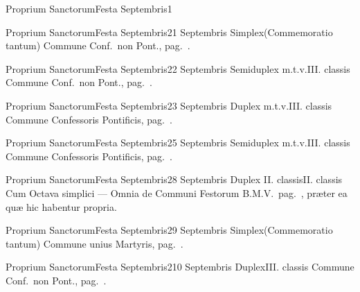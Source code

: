 \documentclass[nocturnale-romanum.tex]{subfiles}
\begin{document}
	{Proprium Sanctorum}{Festa Septembris}{1}{}
	{}{}{}{}

	{Proprium Sanctorum}{Festa Septembris}{2}{1 Septembris}
	{Simplex}{(Commemoratio tantum)}
	{Commune Conf.\ non Pont., pag.\ \pageref{M-CONP}.}
	{}

	{Proprium Sanctorum}{Festa Septembris}{2}{2 Septembris}
	{Semiduplex m.t.v.}{III. classis}
	{Commune Conf.\ non Pont., pag.\ \pageref{M-CONP}.}
	{}

	{Proprium Sanctorum}{Festa Septembris}{2}{3 Septembris}
	{Duplex m.t.v.}{III. classis}
	{Commune Confessoris Pontificis, pag.\ \pageref{M-COPO}.}
	{}

	{Proprium Sanctorum}{Festa Septembris}{2}{5 Septembris}
	{Semiduplex m.t.v.}{III. classis}
	{Commune Confessoris Pontificis, pag.\ \pageref{M-COPO}.}
	{}

	{Proprium Sanctorum}{Festa Septembris}{2}{8 Septembris}
	{Duplex II. classis}{II. classis}
	{Cum Octava simplici --- Omnia de Communi Festorum B.M.V.\ pag.\ \pageref{M-CBMV}, præter ea quæ hic habentur propria.}
	{}

\tedeumrubric

	{Proprium Sanctorum}{Festa Septembris}{2}{9 Septembris}
	{Simplex}{(Commemoratio tantum)}
	{Commune unius Martyris, pag.\ \pageref{M-UMEX}.}
	{}

	{Proprium Sanctorum}{Festa Septembris}{2}{10 Septembris}
	{Duplex}{III. classis}
	{Commune Conf.\ non Pont., pag.\ \pageref{M-CONP}.}
	{}
\end{document}
